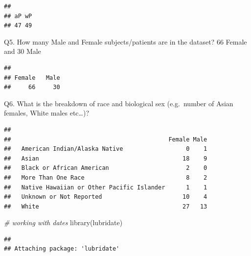 \documentclass[
]{article}
\newenvironment{Shaded}{\begin{snugshade}}{\end{snugshade}}
\newcommand{\CommentTok}[1]{\textcolor[rgb]{0.56,0.35,0.01}{\textit{#1}}}
\newcommand{\FunctionTok}[1]{\textcolor[rgb]{0.00,0.00,0.00}{#1}}
\newcommand{\NormalTok}[1]{#1}
\newcommand{\SpecialCharTok}[1]{\textcolor[rgb]{0.00,0.00,0.00}{#1}}
\begin{document}
\begin{verbatim}
## 
## aP wP 
## 47 49
\end{verbatim}

Q5. How many Male and Female subjects/patients are in the dataset? 66
Female and 30 Male

\begin{Shaded}
\end{Shaded}

\begin{verbatim}
## 
## Female   Male 
##     66     30
\end{verbatim}

Q6. What is the breakdown of race and biological sex (e.g.~number of
Asian females, White males etc\ldots)?

\begin{Shaded}
\end{Shaded}

\begin{verbatim}
##                                            
##                                             Female Male
##   American Indian/Alaska Native                  0    1
##   Asian                                         18    9
##   Black or African American                      2    0
##   More Than One Race                             8    2
##   Native Hawaiian or Other Pacific Islander      1    1
##   Unknown or Not Reported                       10    4
##   White                                         27   13
\end{verbatim}

\begin{Shaded}
\begin{Highlighting}[]
\CommentTok{\# working with dates}
\FunctionTok{library}\NormalTok{(lubridate)}
\end{Highlighting}
\end{Shaded}

\begin{verbatim}
## 
## Attaching package: 'lubridate'
\end{verbatim}
\end{document}
